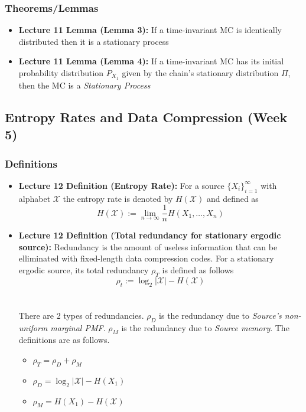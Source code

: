 \documentclass{article}
\begin{document}
\subsubsection{Theorems/Lemmas}
\begin{itemize}
    \item \textbf{Lecture 11 Lemma (Lemma 3):} If a time-invariant MC is identically distributed then it is a stationary process
    \item \textbf{Lecture 11 Lemma (Lemma 4):}  If a time-invariant MC has its initial probability distribution \(P_{X_1}\) given by the chain's stationary distribution \(\Pi\), then the MC is a \textit{Stationary Process}
\end{itemize}

\subsection{Entropy Rates and Data Compression (Week 5)}
\subsubsection{Definitions}
\begin{itemize}
    \item \textbf{Lecture 12 Definition (Entropy Rate):} For a source \(\{X_i\}^\infty_{i=1}\) with alphabet \(\mathcal{X}\) the entropy rate is denoted by \(H(\mathcal{X})\) and defined as
    \[H(\mathcal{X}) := \lim_{n \to \infty} \frac{1}{n} H(X_1, \ldots, X_n)\]
    \item \textbf{Lecture 12 Definition (Total redundancy for stationary ergodic source): } Redundancy is the amount of useless information that can be elliminated with fixed-length data compression codes.
    For a stationary ergodic source, its total redundancy \(\rho_T\) is defined as follows
    \[\rho_t := \log_2 |\mathcal{X}| - H(\mathcal{X})\]
    \\ \\
    There are 2 types of redundancies. \(\rho_D\) is the redundancy due to \textit{Source's non-uniform marginal PMF}. \(\rho_M\) is the redundancy due to \textit{Source memory}. The definitions are as follows.

    \begin{itemize}
        \item \(\rho_T = \rho_D + \rho_M\)
        \item \(\rho_D = \log_2 |\mathcal{X}| - H(X_1)\)
        \item \(\rho_M = H(X_1) - H(\mathcal{X})\)
    \end{itemize}
\end{itemize}
\end{document}

